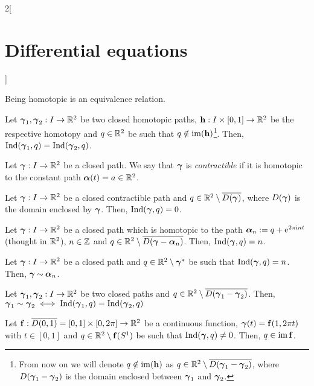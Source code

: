 \documentclass[../../../main.tex]{subfiles}
\begin{document}
\begin{multicols}{2}[\section{Differential equations}]
\begin{lemma}
    Being homotopic is an equivalence relation.
  \end{lemma}
  \begin{proposition}
    Let $\vf\gamma_1,\vf\gamma_2:I\rightarrow\RR^2$ be two closed homotopic paths, $\vf{h}:I\times[0,1]\rightarrow\RR^2$ be the respective homotopy and $q\in\RR^2$ be such that $q\notin \im(\vf{h})$\footnote{From now on we will denote $q\notin \im(\vf{h})$ as $q\in\RR^2\setminus \overline{D(\vf\gamma_1-\vf\gamma_2)}$, where $D(\vf\gamma_1-\vf\gamma_2)$ is the domain enclosed between $\vf\gamma_1$ and $\vf\gamma_2$.}. Then, $\Ind(\vf\gamma_1,q)=\Ind(\vf\gamma_2,q)$.
  \end{proposition}
  \begin{definition}
    Let $\vf\gamma:I\rightarrow\RR^2$ be a closed path. We say that $\vf\gamma$ is \emph{contractible} if it is homotopic to the constant path ${\vf\alpha}(t)=a\in\RR^2$.
  \end{definition}
  \begin{proposition}
    Let $\vf\gamma:I\rightarrow\RR^2$ be a closed contractible path and $q\in\RR^2\setminus \overline{D(\vf\gamma)}$, where $D(\vf\gamma)$ is the domain enclosed by $\vf\gamma$. Then, $\Ind(\vf\gamma,q)=0$.
  \end{proposition}
  \begin{proposition}
    Let $\vf\gamma:I\rightarrow\RR^2$ be a closed path which is homotopic to the path $\vf\alpha_n:=q+\exp{2\pi\ii n t}$ (thought in $\RR^2$), $n\in\ZZ$ and $q\in\RR^2\setminus \overline{D(\vf\gamma-\vf\alpha_n)}$. Then, $\Ind(\vf\gamma,q)=n$.
  \end{proposition}
  \begin{proposition}
    Let $\vf\gamma:I\rightarrow\RR^2$ be a closed path and $q\in\RR^2\setminus\vf\gamma^*$ be such that $\Ind(\vf\gamma,q)=n$. Then, $\vf\gamma\homotop\vf\alpha_n$.
  \end{proposition}
  \begin{theorem}
    Let $\vf\gamma_1,\vf\gamma_2:I\rightarrow\RR^2$ be two closed paths and $q\in\RR^2\setminus \overline{D(\vf\gamma_1-\vf\gamma_2)}$. Then, $\vf\gamma_1\sim\vf\gamma_2\iff\Ind(\vf\gamma_1,q)=\Ind(\vf\gamma_2,q)$
  \end{theorem}
  \begin{theorem}
    Let $\vf{f}:\overline{D(0,1)}=[0,1]\times[0,2\pi]\rightarrow\RR^2$ be a continuous function, $\vf\gamma(t)=\vf{f}(1,2\pi t)$ with $t\in[0,1]$ and $q\in\RR^2\setminus \vf{f}(S^1)$ be such that $\Ind(\vf\gamma,q)\ne 0$. Then, $q\in \im\vf{f}$.
  \end{theorem}

\end{multicols}
\end{document}
